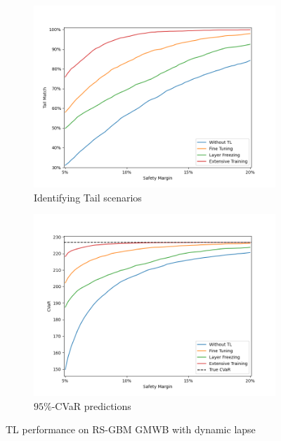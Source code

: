 \begin{figure}[ht!]
    \centering
    \begin{subfigure}{0.48\textwidth}
        \includegraphics[width=\textwidth]{./project3/figures/figure4_1.png}
        \caption{Identifying Tail scenarios} 
        \label{subfig3-4-1:tail}
    \end{subfigure}\hfill
    \begin{subfigure}{0.48\textwidth}
        \includegraphics[width=\textwidth]{./project3/figures/figure4_2.png}
        \caption{$95\%$-CVaR predictions}
        \label{subfig3-4-2:CVaR}
    \end{subfigure}
    \caption{TL performance on RS-GBM GMWB with dynamic lapse}
    \label{fig3:figure4-1}
\end{figure}

